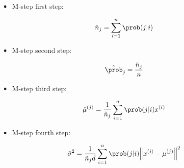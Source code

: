\documentclass[a4paper, 12pt]{article}
\begin{document}
\begin{itemize}
\item M-step first step:
\end{itemize}

\begin{equation}
\hat{n}_j = \sum_{i=1}^{n} \prob(j|i)
\end{equation}

\begin{itemize}
\item M-step second step:
\end{itemize}

\begin{equation}
\hat{\prob}_j = \frac{\hat{n}_j}{n}
\end{equation}

\begin{itemize}
\item M-step third step:
\end{itemize}

\begin{equation}
\hat{\mu}^{(j)} = \frac{1}{\hat{n}_j} \sum_{i=1}^{n} \prob(j|i) x^{(i)}
\end{equation}

\begin{itemize}
\item M-step fourth step:
\end{itemize}

\begin{equation}
\hat{\sigma}^2 = \frac{1}{\hat{n}_jd} \sum_{i=1}^{n} \prob(j|i) \norm{x^{(i)} - \mu^{(j)}}^2
\end{equation}
\end{document}
